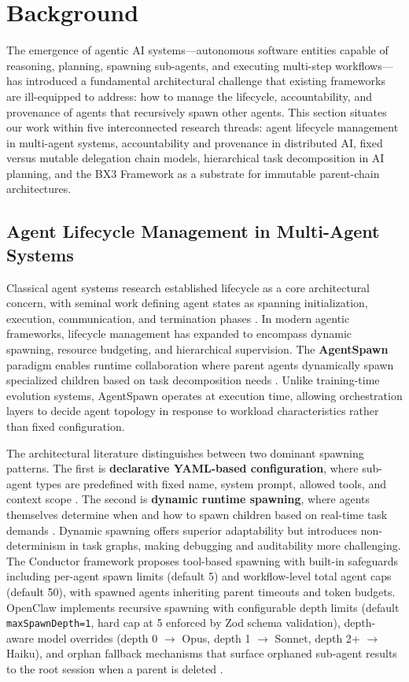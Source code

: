 \section{Background}

The emergence of agentic AI systems---autonomous software entities capable of reasoning, planning, spawning sub-agents, and executing multi-step workflows---has introduced a fundamental architectural challenge that existing frameworks are ill-equipped to address: how to manage the lifecycle, accountability, and provenance of agents that recursively spawn other agents. This section situates our work within five interconnected research threads: agent lifecycle management in multi-agent systems, accountability and provenance in distributed AI, fixed versus mutable delegation chain models, hierarchical task decomposition in AI planning, and the BX3 Framework as a substrate for immutable parent-chain architectures.

\subsection{Agent Lifecycle Management in Multi-Agent Systems}

Classical agent systems research established lifecycle as a core architectural concern, with seminal work defining agent states as spanning initialization, execution, communication, and termination phases \cite{ferber1999multi}. In modern agentic frameworks, lifecycle management has expanded to encompass dynamic spawning, resource budgeting, and hierarchical supervision. The \textbf{AgentSpawn} paradigm enables runtime collaboration where parent agents dynamically spawn specialized children based on task decomposition needs \cite{agentspawn2025}. Unlike training-time evolution systems, AgentSpawn operates at execution time, allowing orchestration layers to decide agent topology in response to workload characteristics rather than fixed configuration.

The architectural literature distinguishes between two dominant spawning patterns. The first is \textbf{declarative YAML-based configuration}, where sub-agent types are predefined with fixed name, system prompt, allowed tools, and context scope \cite{nibzard2025subagent}. The second is \textbf{dynamic runtime spawning}, where agents themselves determine when and how to spawn children based on real-time task demands \cite{microsoftconductor2025dynamic}. Dynamic spawning offers superior adaptability but introduces non-determinism in task graphs, making debugging and auditability more challenging. The Conductor framework proposes tool-based spawning with built-in safeguards including per-agent spawn limits (default 5) and workflow-level total agent caps (default 50), with spawned agents inheriting parent timeouts and token budgets. OpenClaw implements recursive spawning with configurable depth limits (default \texttt{maxSpawnDepth=1}, hard cap at 5 enforced by Zod schema validation), depth-aware model overrides (depth 0 $\rightarrow$ Opus, depth 1 $\rightarrow$ Sonnet, depth 2+ $\rightarrow$ Haiku), and orphan fallback mechanisms that surface orphaned sub-agent results to the root session when a parent is deleted \cite{openclaw2025recursive}.

